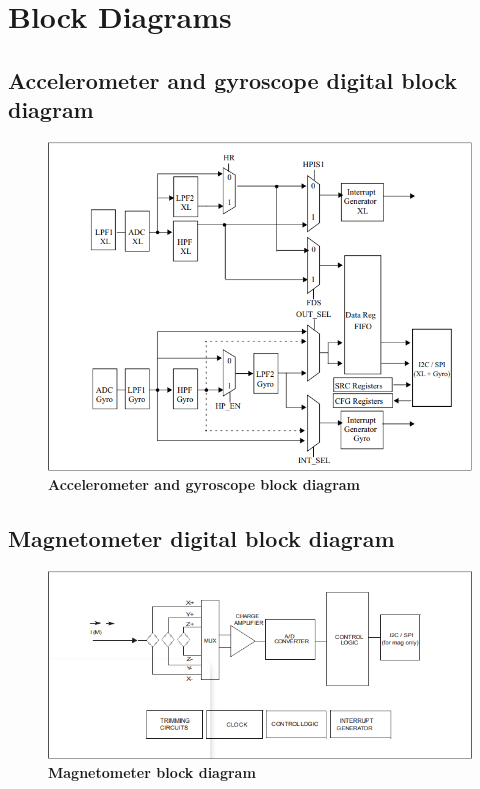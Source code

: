 %
%



\chapter{Block Diagrams}

\section{Accelerometer and gyroscope digital block diagram}
\begin{figure}[h!]
	\centering	\includegraphics[width=\linewidth]{Images/acceandgyroblock}
	\caption{\textbf{Accelerometer and gyroscope block diagram}} 
\end{figure}

\newpage
\section{Magnetometer digital block diagram}
\begin{figure}[h!]
	\centering	\includegraphics[width=\linewidth]{Images/magnetometerblock}
	\caption{\textbf{Magnetometer block diagram}} 
\end{figure}

